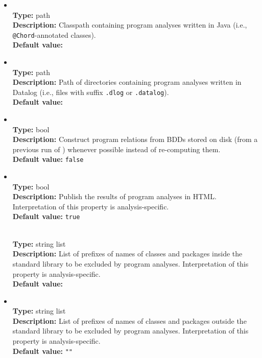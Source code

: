 \begin{itemize}
\item
{} \\
{\bf Type:} path \\
{\bf Description:} Classpath containing program analyses written in Java (i.e., {\tt @Chord}-annotated classes). \\
{\bf Default value:}  

\item
{} \\
{\bf Type:} path \\
{\bf Description:} Path of directories containing program analyses written in Datalog (i.e., files with suffix {\tt .dlog} or {\tt .datalog}). \\
{\bf Default value:}  

\item
{} \\
{\bf Type:} bool \\
{\bf Description:} Construct program relations from BDDs stored on disk (from a previous run of \Chord) whenever possible instead of re-computing them. \\
{\bf Default value:} {\tt false} 

\item
{} \\
{\bf Type:} bool \\
{\bf Description:} Publish the results of program analyses in HTML.  Interpretation of this property is analysis-specific. \\
{\bf Default value:} {\tt true} 

 \\
{\bf Type:} string list \\
{\bf Description:} List of prefixes of names of classes and packages inside the standard library to be excluded by program analyses.  Interpretation of this property is analysis-specific. \\
{\bf Default value:}  

\item
{} \\
{\bf Type:} string list \\
{\bf Description:} List of prefixes of names of classes and packages outside the standard library to be excluded by program analyses.  Interpretation of this property is analysis-specific. \\
{\bf Default value:} {\tt ""}


\end{itemize}
